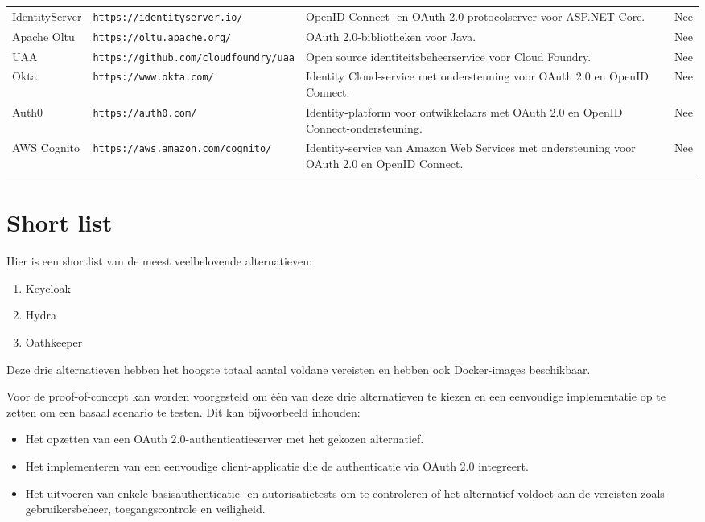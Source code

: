 \begin{table}[htbp]
\begin{adjustbox}{width=1\textwidth}
\begin{tabular}{@{}llll@{}}
    IdentityServer & \texttt{https://identityserver.io/}    & OpenID Connect- en OAuth 2.0-protocolserver voor ASP.NET Core.               & Nee                       \\
    Apache Oltu   & \texttt{https://oltu.apache.org/}      & OAuth 2.0-bibliotheken voor Java.                                             & Nee                       \\
    UAA           & \texttt{https://github.com/cloudfoundry/uaa} & Open source identiteitsbeheerservice voor Cloud Foundry.                & Nee                       \\
    Okta          & \texttt{https://www.okta.com/}         & Identity Cloud-service met ondersteuning voor OAuth 2.0 en OpenID Connect.    & Nee                       \\
    Auth0         & \texttt{https://auth0.com/}            & Identity-platform voor ontwikkelaars met OAuth 2.0 en OpenID Connect-ondersteuning. & Nee                       \\
    AWS Cognito   & \texttt{https://aws.amazon.com/cognito/} & Identity-service van Amazon Web Services met ondersteuning voor OAuth 2.0 en OpenID Connect. & Nee                       \\ \bottomrule
  \end{tabular}
  \end{adjustbox}
\end{table}


\section{Short list}%
\label{sec:short-list}
Hier is een shortlist van de meest veelbelovende alternatieven:
\begin{enumerate}
    \item Keycloak
    \item Hydra
    \item Oathkeeper
\end{enumerate}

Deze drie alternatieven hebben het hoogste totaal aantal voldane vereisten en hebben ook Docker-images beschikbaar.

Voor de proof-of-concept kan worden voorgesteld om één van deze drie alternatieven te kiezen en een eenvoudige implementatie op te zetten om een basaal scenario te testen. Dit kan bijvoorbeeld inhouden:

\begin{itemize}
    \item Het opzetten van een OAuth 2.0-authenticatieserver met het gekozen alternatief.
    \item Het implementeren van een eenvoudige client-applicatie die de authenticatie via OAuth 2.0 integreert.
    \item Het uitvoeren van enkele basisauthenticatie- en autorisatietests om te controleren of het alternatief voldoet aan de vereisten zoals gebruikersbeheer, toegangscontrole en veiligheid.
\end{itemize}

